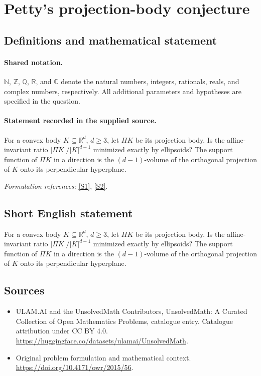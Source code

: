 \documentclass[11pt]{article}
\newcommand{\sref}[2]{\hyperlink{source:#1:#2}{[S#2]}}
\begin{document}
\section{Petty's projection-body conjecture}\label{statement}

\subsection{Definitions and mathematical statement}

\paragraph{Shared notation.}$\mathbb N$, $\mathbb Z$, $\mathbb Q$, $\mathbb R$, and $\mathbb C$ denote the natural numbers, integers, rationals, reals, and complex numbers, respectively. All additional parameters and hypotheses are specified in the question.


\paragraph{Statement recorded in the supplied source.}
For a convex body $K\subseteq\mathbb R^d$, $d\geq3$, let $\Pi K$ be its projection body. Is the affine-invariant ratio $|\Pi K|/|K|^{d-1}$ minimized exactly by ellipsoids? The support function of $\Pi K$ in a direction is the $(d-1)$-volume of the orthogonal projection of $K$ onto its perpendicular hyperplane.
\par\smallskip\textit{Formulation references:} \sref{statement}{1}, \sref{statement}{2}.
\subsection{Short English statement}
For a convex body $K\subseteq\mathbb R^d$, $d\geq3$, let $\Pi K$ be its projection body. Is the affine-invariant ratio $|\Pi K|/|K|^{d-1}$ minimized exactly by ellipsoids? The support function of $\Pi K$ in a direction is the $(d-1)$-volume of the orthogonal projection of $K$ onto its perpendicular hyperplane.
\subsection{Sources}
\begin{itemize}
\item[\hypertarget{source:statement:1}{S1}] ULAM.AI and the UnsolvedMath Contributors, UnsolvedMath: A Curated Collection of Open Mathematics Problems, catalogue entry. Catalogue attribution under CC BY 4.0.
\url{https://huggingface.co/datasets/ulamai/UnsolvedMath}.
\item[\hypertarget{source:statement:2}{S2}] Original problem formulation and mathematical context.
\url{https://doi.org/10.4171/owr/2015/56}.
\end{itemize}
\label{end:statement}
\end{document}

